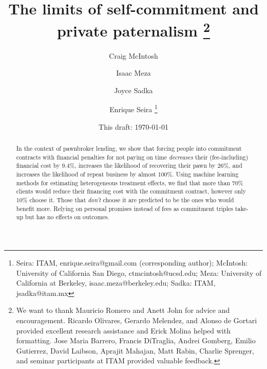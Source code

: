 \documentclass[oneside,11pt]{article}
\begin{document}
\title{The limits of self-commitment and private paternalism \thanks{We want to thank Mauricio Romero and Anett John for advice and encouragement. Ricardo Olivares, Gerardo Melendez, and Alonso de Gortari provided excellent research assistance and Erick Molina helped with formatting. Jose Maria Barrero, Francis DiTraglia, Andrei Gomberg, Emilio Gutierrez, David Laibson, Aprajit Mahajan, Matt Rabin, Charlie Sprenger, and seminar participants at ITAM provided valuable feedback.}}
\author{Craig McIntosh \and Isaac Meza \and Joyce Sadka \and Enrique Seira   \thanks{Seira: ITAM, enrique.seira@gmail.com (corresponding author); McIntosh:  University of California San Diego, ctmcintosh@ucsd.edu; Meza: University of California at Berkeley, isaac.meza@berkeley.edu; Sadka: ITAM, jsadka@itam.mx} }
\date{This draft:  \today \\[2 cm]}



\maketitle
\thispagestyle{empty}
\begin{abstract}


In the context of pawnbroker lending, we show that forcing people into commitment contracts with financial penalties for not paying on time \textit{decreases} their (fee-including) financial cost by 9.4\%, increases the likelihood of recovering their pawn by 26\%, and increases the likelihood of repeat business by almost 100\%. Using machine learning methods for estimating heterogeneous treatment effects, we find that more than {70}\% clients would reduce their financing cost with the commitment contract, however only 10\% choose it. Those that \textit{don't} choose it are predicted to be the ones who would benefit more. Relying on personal promises instead of fees as commitment triples take-up but has no effects on outcomes.


\end{abstract}
\end{document}
